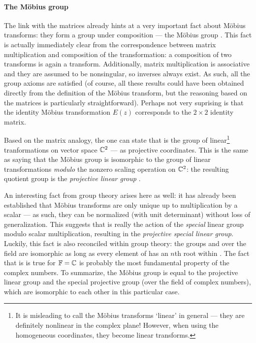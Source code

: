 \paragraph{The Möbius group} The link with the matrices already hints at a very important fact about Möbius transforms: they form a group under composition --- the Möbius group \moebiusgroup. This fact is actually immediately clear from the correspondence between matrix multiplication and composition of the transformation: a composition of two transforms is again a transform. Additionally, matrix multiplication is associative and they are assumed to be nonsingular, so inverses always exist. As such, all the group axioms are satisfied (of course, all these results could have been obtained directly from the definition of the Möbius transform, but the reasoning based on the matrices is particularly straightforward). Perhaps not very suprising is that the identity Möbius transformation \(E(z)\) corresponds to the \(2\times 2\) identity matrix.

Based on the matrix analogy, the one can state that \moebiusgroup is the group of linear\footnote{It is misleading to call the Möbius transforms `linear' in general --- they are definitely nonlinear in the complex plane! However, when using the homogeneous coordinates, they become linear transforms.} tranformations on vector space \(\mathbb{C}^2\) --- as projective coordinates. This is the same as saying that the Möbius group is isomorphic to the group of linear transformations \emph{modulo} the nonzero scaling operation on \(\mathbb{C}^2\): the resulting quotient group is the \emph{projective linear group} .

An interesting fact from group theory arises here as well: it has already been established that Möbius transforms are only unique up to multiplication by a scalar --- as such, they can be normalized (with unit determinant) without loss of generalization. This suggests that \moebiusgroup is really the action of the \emph{special} linear group modulo scalar multiplication, resulting in the \emph{projective special linear group}. Luckily, this fact is also reconciled within group theory: the groups  and  over the field \field are isomorphic as long as every element of \field has an \(n\)th root within \field. The fact that is is true for \(\mathbb{F} = \mathbb{C}\) is probably the most fundamental property of the complex numbers. To summarize, the Möbius group \moebiusgroup is equal to the projective linear group and the special projective group (over the field of complex numbers), which are isomorphic to each other in this particular case.

